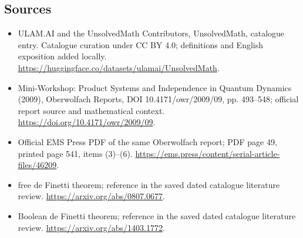 \documentclass[11pt]{article}
\begin{document}
\subsection{Sources}
\begin{itemize}
\item[\hypertarget{source:statement:1}{S1}] ULAM.AI and the UnsolvedMath Contributors, UnsolvedMath, catalogue entry. Catalogue curation under CC BY 4.0; definitions and English exposition added locally.
\url{https://huggingface.co/datasets/ulamai/UnsolvedMath}.
\item[\hypertarget{source:statement:2}{S2}] Mini-Workshop: Product Systems and Independence in Quantum Dynamics (2009), Oberwolfach Reports, DOI 10.4171/owr/2009/09, pp. 493--548; official report source and mathematical context.
\url{https://doi.org/10.4171/owr/2009/09}.
\item[\hypertarget{source:statement:3}{S3}] Official EMS Press PDF of the same Oberwolfach report; PDF page 49, printed page 541, items (3)--(6).
\url{https://ems.press/content/serial-article-files/46209}.
\item[\hypertarget{source:statement:4}{S4}] free de Finetti theorem; reference in the saved dated catalogue literature review.
\url{https://arxiv.org/abs/0807.0677}.
\item[\hypertarget{source:statement:5}{S5}] Boolean de Finetti theorem; reference in the saved dated catalogue literature review.
\url{https://arxiv.org/abs/1403.1772}.
\end{itemize}
\label{end:statement}
\end{document}
